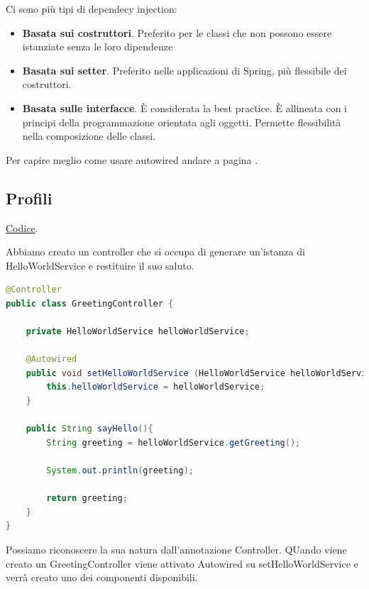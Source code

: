 \documentclass[11pt,a4paper]{book}
\begin{document}
Ci sono più tipi di dependecy injection:
\begin{itemize}
	\item \textbf{Basata sui costruttori}. Preferito per le classi che non possono essere istanziate senza le loro dipendenze
	\item \textbf{Basata sui setter}. Preferito nelle applicazioni di Spring, più flessibile dei costruttori.
	\item \textbf{Basata sulle interfacce}. È considerata la best practice. È allineata con i principi della programmazione orientata agli oggetti. Permette flessibilità nella composizione delle classi.
\end{itemize}

Per capire meglio come usare autowired andare a pagina \pageref{par: Autowired}.

\subsection{Profili}
\href{Codici/Controllers}{Codice}.

Abbiamo creato un controller che si occupa di generare un'istanza di HelloWorldService e restituire il suo saluto.
\begin{lstlisting}[language = Java]
@Controller
public class GreetingController {

    private HelloWorldService helloWorldService;

    @Autowired
    public void setHelloWorldService (HelloWorldService helloWorldService) {
        this.helloWorldService = helloWorldService;
    }

    public String sayHello(){
        String greeting = helloWorldService.getGreeting();

        System.out.println(greeting);

        return greeting;
    }
}
\end{lstlisting}
Possiamo riconoscere la sua natura dall'annotazione Controller. QUando viene creato un GreetingController viene attivato Autowired su setHelloWorldService e verrà creato uno dei componenti disponibili.
\end{document}
